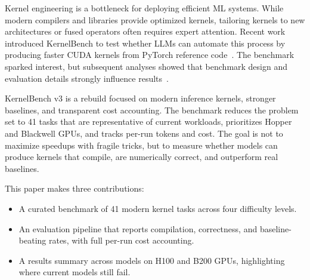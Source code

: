 Kernel engineering is a bottleneck for deploying efficient ML systems. While modern compilers and libraries provide optimized kernels, tailoring kernels to new architectures or fused operators often requires expert attention. Recent work introduced KernelBench to test whether LLMs can automate this process by producing faster CUDA kernels from PyTorch reference code~\cite{kernelbench}. The benchmark sparked interest, but subsequent analyses showed that benchmark design and evaluation details strongly influence results~\cite{metr2025}.

KernelBench v3 is a rebuild focused on modern inference kernels, stronger baselines, and transparent cost accounting. The benchmark reduces the problem set to 41 tasks that are representative of current workloads, prioritizes Hopper and Blackwell GPUs, and tracks per-run tokens and cost. The goal is not to maximize speedups with fragile tricks, but to measure whether models can produce kernels that compile, are numerically correct, and outperform real baselines.

This paper makes three contributions:
\begin{itemize}[leftmargin=1.2em]
    \item A curated benchmark of 41 modern kernel tasks across four difficulty levels.
    \item An evaluation pipeline that reports compilation, correctness, and baseline-beating rates, with full per-run cost accounting.
    \item A results summary across \TotalModels{} models on H100 and B200 GPUs, highlighting where current models still fail.
\end{itemize}
